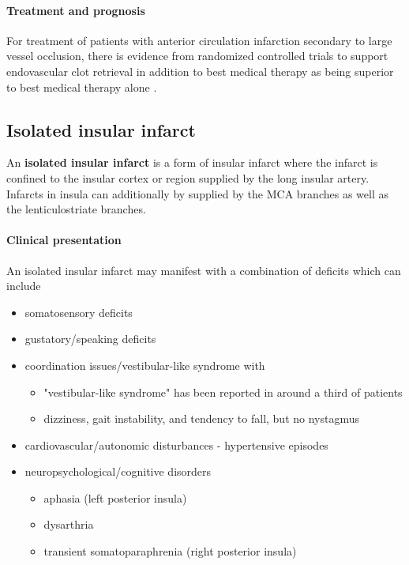 \paragraph{Treatment and prognosis}

For treatment of patients with anterior circulation infarction secondary to large vessel occlusion, there is evidence from randomized controlled trials to support endovascular clot retrieval in addition to best medical therapy as being superior to best medical therapy alone .

\subsection{Isolated insular infarct}

An \textbf{isolated insular infarct} is a form of insular infarct where the infarct is confined to the insular cortex or region supplied by the long insular artery. Infarcts in insula can additionally by supplied by the MCA branches as well as the lenticulostriate branches.

\paragraph{Clinical presentation}

An isolated insular infarct may manifest with a combination of deficits which can include 

\begin{itemize}
	\tightlist
	\item
	somatosensory deficits
	\item
	gustatory/speaking deficits
	\item
	coordination issues/vestibular-like syndrome with
	
	\begin{itemize}
		\tightlist
		\item
		"vestibular-like syndrome" has been reported in around a third of patients 
		\item
		dizziness, gait instability, and tendency to fall, but no nystagmus
	\end{itemize}
	\item
	cardiovascular/autonomic disturbances - hypertensive episodes
	\item
	neuropsychological/cognitive disorders
	
	\begin{itemize}
		\tightlist
		\item
		aphasia (left posterior insula)
		\item
		dysarthria
		\item
		transient somatoparaphrenia (right posterior insula)
	\end{itemize}
\end{itemize}

